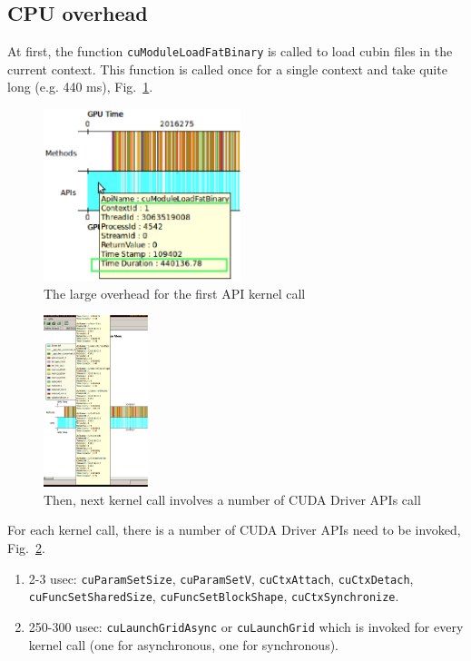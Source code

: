 \subsection{CPU overhead}
\label{sec:cpu-overhead}

At first, the function \verb!cuModuleLoadFatBinary! is called to load
cubin files in the current context. This function is called once for a
single context and take quite long (e.g. 440 ms),
Fig.~\ref{fig:CUDA_driver_API_1}.
\begin{figure}[hbt]
  \centerline{\includegraphics[height=5cm,
    angle=0]{./images/CUDA_driver_API_1.eps}}
\caption{The large overhead for the first API kernel call}
\label{fig:CUDA_driver_API_1}
\end{figure}

\begin{figure}[hbt]
  \centerline{\includegraphics[height=5cm,
    angle=0]{./images/CUDA_driver_API_2.eps}}
  \caption{Then, next kernel call involves a number of CUDA Driver
    APIs call}
  \label{fig:CUDA_driver_API_2}
\end{figure}

For each kernel call, there is a number of CUDA Driver APIs need to be
invoked, Fig.~\ref{fig:CUDA_driver_API_2}.
\begin{enumerate}
\item 2-3 usec: \verb!cuParamSetSize!, \verb!cuParamSetV!,
  \verb!cuCtxAttach!, \verb!cuCtxDetach!, \verb!cuFuncSetSharedSize!,
  \verb!cuFuncSetBlockShape!, \verb!cuCtxSynchronize!. 

\item 250-300 usec: \verb!cuLaunchGridAsync! or \verb!cuLaunchGrid!
  which is invoked for every kernel call (one for asynchronous, one
  for synchronous).
\end{enumerate}

